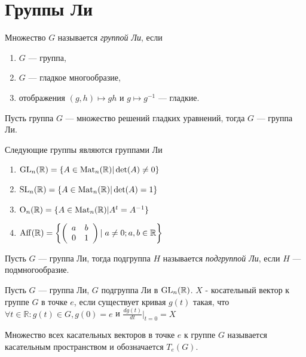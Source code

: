 \section{Группы Ли}

\begin{defi}
Множество $G$ называется \textit{группой Ли}, если
\begin{enumerate}
\item $G$ — группа,
\item $G$ — гладкое многообразие,
\item отображения $(g,h)\mapsto gh$ и $g\mapsto g^{-1}$ — гладкие.
\end{enumerate}
\end{defi}

\begin{ass}
Пусть группа $G$ — множество решений гладких уравнений, тогда $G$ — группа Ли.
\end{ass}

\begin{examples} Следующие группы являются группами Ли
\begin{enumerate}
\item $\operatorname{GL}_n(\mathbb{R})=\{A\in \operatorname{Mat}_n(\mathbb{R})|\det(A)\neq 0\}$
\item $\operatorname{SL}_n(\mathbb{R})=\{A\in\operatorname{Mat}_n(\mathbb{R})|\det(A) = 1\}$
\item $\operatorname{O}_n(\mathbb{R})=\{A\in\operatorname{Mat}_n(\mathbb{R})|A^t=A^{-1}\}$
\item $\operatorname{Aff}(\mathbb{R})=\left\{\left(\begin{array}{cc}a & b \\0 & 1\end{array}\right)\left|\right.a\neq0;a,b\in\mathbb{R}\right\}$
\end{enumerate}
\end{examples}

\begin{defi}
Пусть $G$ — группа Ли, тогда подгруппа $H$ называется \textit{подгруппой Ли}, если $H$ — подмногообразие.
\end{defi}

\begin{defi}
Пусть $G$ — группа Ли, $G$ подгруппа Ли в $\operatorname{GL}_n(\mathbb{R})$. $X$ - косательный вектор к группе $G$ в точке $e$, если существует кривая $g(t)$ такая, что $\forall t\in\mathbb{R}:g(t)\in G, g(0)=e$ и $\frac{dg(t)}{dt}|_{t=0}=X$
\end{defi}

\begin{defi}
Множество всех касательных векторов в точке $e$ к группе $G$ называется касательным пространством и обозначается $T_e(G)$.
\end{defi}

